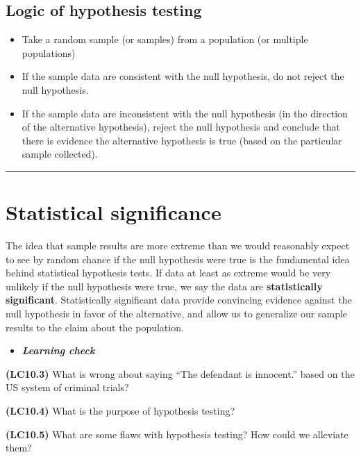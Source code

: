 \documentclass[12pt, krantz2,]{krantz}
\providecommand{\tightlist}{%
  \setlength{\itemsep}{0pt}\setlength{\parskip}{0pt}}
\newenvironment{rmdblock}[1]
  {\begin{shaded*}
  \begin{itemize}
  \renewcommand{\labelitemi}{
    \raisebox{-.7\height}[0pt][0pt]{
    }
  }
  \item
  }
  {
  \end{itemize}
  \end{shaded*}
  }
\newenvironment{learncheck}
  {\begin{rmdblock}{warning}}
  {\end{rmdblock}}
\begin{document}
\hypertarget{logic-of-hypothesis-testing}{%
\subsection{Logic of hypothesis testing}\label{logic-of-hypothesis-testing}}

\begin{itemize}
\tightlist
\item
  Take a random sample (or samples) from a population (or multiple populations)
\item
  If the sample data are consistent with the null hypothesis, do not reject the null hypothesis.
\item
  If the sample data are inconsistent with the null hypothesis (in the direction of the alternative hypothesis), reject the null hypothesis and conclude that there is evidence the alternative hypothesis is true (based on the particular sample collected).
\end{itemize}

\begin{center}\rule{0.5\linewidth}{\linethickness}\end{center}

\hypertarget{statistical-significance}{%
\section{Statistical significance}\label{statistical-significance}}

The idea that sample results are more extreme than we would reasonably expect to see by random chance if the null hypothesis were true is the fundamental idea behind statistical hypothesis tests. If data at least as extreme would be very unlikely if the null hypothesis were true, we say the data are \textbf{statistically significant}. Statistically significant data provide convincing evidence against the null hypothesis in favor of the alternative, and allow us to generalize our sample results to the claim about the population.

\begin{learncheck}
\textbf{\emph{Learning check}}
\end{learncheck}

\textbf{(LC10.3)} What is wrong about saying ``The defendant is innocent.'' based on the US system of criminal trials?

\textbf{(LC10.4)} What is the purpose of hypothesis testing?

\textbf{(LC10.5)} What are some flaws with hypothesis testing? How could we alleviate them?
\end{document}
